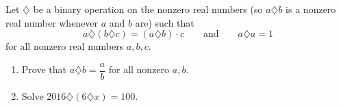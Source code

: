 Let $\diamondsuit$ be a binary operation on the nonzero real numbers (so $a\diamondsuit b$ is a nonzero real number whenever $a$ and $b$ are) such that
\[a\diamondsuit(b\diamondsuit c)=(a\diamondsuit b)\cdot c\qquad\text{and}\qquad a\diamondsuit a=1\]
for all nonzero real numbers $a,b,c$.
\begin{enumerate}
\item[(a)] Prove that $a\diamondsuit b=\dfrac ab$ for all nonzero $a,b$.
\item[(b)] Solve $2016\diamondsuit(6\diamondsuit x)=100$.
\end{enumerate}

